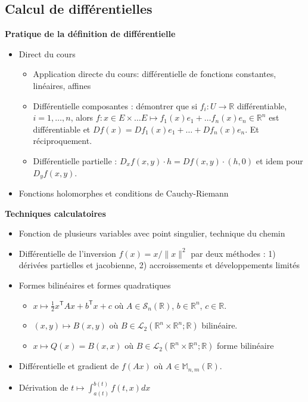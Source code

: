 \documentclass[11pt,a4paper]{article}
\begin{document}
\subsection{Calcul de différentielles}

{
\color{Blue} 

\noindent 
\textbf{Pratique de la définition de différentielle}
\begin{itemize}
    \item Direct du cours
    \begin{itemize}
        \item Application directe du cours: différentielle de fonctions constantes, linéaires, affines 
        \item Différentielle composantes : démontrer que si $f_i : U \to \mathbb R$ différentiable, $i = 1, \dots, n$, alors $f : x \in E \times \dots E \mapsto f_1(x) e_1 + \dots f_n(x) e_n \in \mathbb R^n$ est différentiable et $Df(x) = D f_1(x) e_1 + \dots + D f_n(x) e_n$. Et réciproquement. 
        \item Différentielle partielle : $D_x f(x, y) \cdot h = D f(x ,y) \cdot (h, 0)$ et idem pour $D_y f(x, y)$. 
    \end{itemize}
    \item Fonctions holomorphes et conditions de Cauchy-Riemann
\end{itemize}

\noindent 
\textbf{Techniques calculatoires} 
\begin{itemize} 
    \item Fonction de plusieurs variables avec point singulier, technique du chemin 
    
    \item Différentielle de l'inversion $f(x) = x / \| x \|^2$ par deux méthodes : 1) dérivées partielles et jacobienne, 2) accroissements et développements limités 
    \item Formes bilinéaires et formes quadratiques 
    \begin{itemize} 
        \item $x \mapsto \frac{1}{2} x^\mathsf T A x + b^\mathsf T x + c$ où $A \in \mathcal S_n(\mathbb R)$, $b \in \mathbb R^n$, $c \in \mathbb R$.
        \item $(x, y) \mapsto B(x, y)$ où $B \in \mathcal L_2(\mathbb R^n \times \mathbb R^n ; \mathbb R)$ bilinéaire.
        \item $x \mapsto Q(x) = B(x, x)$ où $B \in \mathcal L_2(\mathbb R^n \times \mathbb R^n ; \mathbb R)$ forme bilinéaire 
    \end{itemize}
    \item Différentielle et gradient de $f(A x)$ où $A \in \mathbb M_{n,m}(\mathbb R)$. 
    \item Dérivation de $t \mapsto \displaystyle \int_{a(t)}^{b(t)} f(t, x) dx$
\end{itemize}

}
\end{document}
